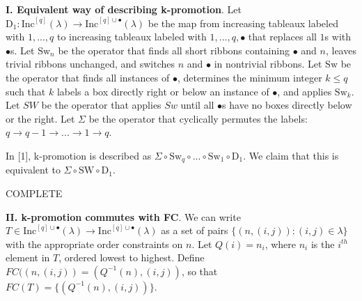 \documentclass[10pt,letter]{article}
\begin{document}
\textbf{I. Equivalent way of describing k-promotion}. Let $\text{D}_1: \text{Inc}^{[q]}(\lambda) \rightarrow \text{Inc}^{[q]\cup \bullet}(\lambda)$ be the map from increasing tableaux labeled with $1,...,q$ to increasing tableaux labeled with $1,...,q,\bullet$ that replaces all $1$s with $\bullet$s. Let $\text{Sw}_n$ be the operator that finds all short ribbons containing $\bullet$ and $n$, leaves trivial ribbons unchanged, and switches $n$ and $\bullet$ in nontrivial ribbons. Let $\text{Sw}$ be the operator that finds all instances of $\bullet$, determines the minimum integer $k \leq q$ such that $k$ labels a box directly right or below an instance of $\bullet$, and applies $\text{Sw}_k$. Let $SW$ be the operator that applies $Sw$ until all $\bullet$s have no boxes directly below or the right. Let $\Sigma$ be the operator that cyclically permutes the labels: $q \rightarrow q-1 \rightarrow ... \rightarrow 1 \rightarrow q$. 

In [1], k-promotion is described as $\Sigma \circ \text{Sw}_q \circ ... \circ \text{Sw}_1 \circ \text{D}_1$. We claim that this is equivalent to $\Sigma \circ \text{SW} \circ \text{D}_1$. 

COMPLETE

\textbf{II. k-promotion commutes with FC}. We can write $T \in \text{Inc}^{[q]\cup \bullet}(\lambda) \rightarrow \text{Inc}^{[q]\cup \bullet}(\lambda)$ as a set of pairs $\lbrace (n,(i,j)): (i,j) \in \lambda \rbrace$ with the appropriate order constraints on $n$. Let $Q(i) = n_i$, where $n_i$ is the $i^{th}$ element in $T$, ordered lowest to highest. Define $FC((n,(i,j)) = (Q^{-1}(n),(i,j))$, so that $FC(T) = \lbrace (Q^{-1}(n),(i,j)) \rbrace$. 
\end{document}
